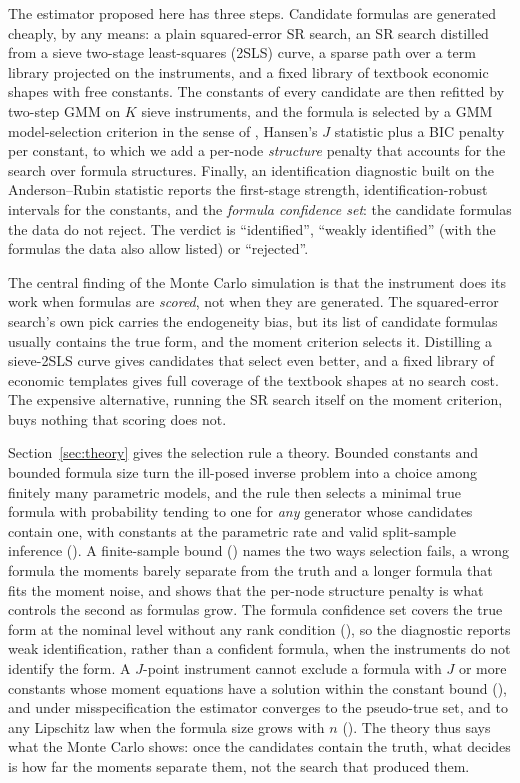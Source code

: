 The estimator proposed here has three steps. Candidate formulas are generated cheaply, by any means: a plain squared-error SR search, an SR search distilled from a sieve two-stage least-squares (2SLS) curve, a sparse path over a term library projected on the instruments, and a fixed library of textbook economic shapes with free constants. The constants of every candidate are then refitted by two-step GMM on $K$ sieve instruments, and the formula is selected by a GMM model-selection criterion in the sense of \citet{andrewslu2001}, Hansen's $J$ statistic plus a BIC penalty per constant, to which we add a per-node \emph{structure} penalty that accounts for the search over formula structures. Finally, an identification diagnostic built on the Anderson--Rubin statistic \citep{stockwright2000} reports the first-stage strength, identification-robust intervals for the constants, and the \emph{formula confidence set}: the candidate formulas the data do not reject. The verdict is ``identified'', ``weakly identified'' (with the formulas the data also allow listed) or ``rejected''.

The central finding of the Monte Carlo simulation is that the instrument does its work when formulas are \emph{scored}, not when they are generated. The squared-error search's own pick carries the endogeneity bias, but its list of candidate formulas usually contains the true form, and the moment criterion selects it. Distilling a sieve-2SLS curve gives candidates that select even better, and a fixed library of economic templates gives full coverage of the textbook shapes at no search cost. The expensive alternative, running the SR search itself on the moment criterion, buys nothing that scoring does not.

Section~\ref{sec:theory} gives the selection rule a theory. Bounded constants and bounded formula size turn the ill-posed inverse problem into a choice among finitely many parametric models, and the rule then selects a minimal true formula with probability tending to one for \emph{any} generator whose candidates contain one, with constants at the parametric rate and valid split-sample inference (). A finite-sample bound () names the two ways selection fails, a wrong formula the moments barely separate from the truth and a longer formula that fits the moment noise, and shows that the per-node structure penalty is what controls the second as formulas grow. The formula confidence set covers the true form at the nominal level without any rank condition (), so the diagnostic reports weak identification, rather than a confident formula, when the instruments do not identify the form. A $J$-point instrument cannot exclude a formula with $J$ or more constants whose moment equations have a solution within the constant bound (), and under misspecification the estimator converges to the pseudo-true set, and to any Lipschitz law when the formula size grows with $n$ (). The theory thus says what the Monte Carlo shows: once the candidates contain the truth, what decides is how far the moments separate them, not the search that produced them.

